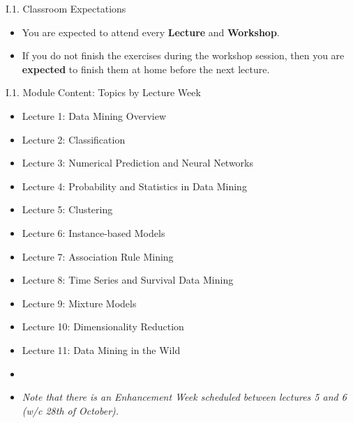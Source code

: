 \documentclass[handout]{beamer}
\newcommand{\strong}[1]{\textbf{\color{teal} #1}}
\begin{document}
\begin{frame}{I.1. Classroom Expectations}
\begin{itemize}
%
\item You are expected to attend every \strong{Lecture} and \strong{Workshop}.\\

\item If you do not finish the exercises during the workshop session, then you are \strong{expected} to finish them at home before the next lecture.
%
\end{itemize}
\end{frame}
\begin{frame}{I.1. Module Content: Topics by Lecture Week}
\begin{itemize}
\item Lecture 1: Data Mining Overview
\item Lecture 2: Classification
\item Lecture 3: Numerical Prediction and Neural Networks
\item Lecture 4: Probability and Statistics in Data Mining
\item Lecture 5: Clustering
\item Lecture 6: Instance-based Models
\item Lecture 7: Association Rule Mining
\item Lecture 8: Time Series and Survival Data Mining
\item Lecture 9: Mixture Models
\item Lecture 10: Dimensionality Reduction
\item Lecture 11: Data Mining in the Wild
\item[]
\item[] \emph{Note that there is an Enhancement Week scheduled between lectures 5 and 6 (w/c 28th of October).}
\end{itemize}
\end{frame}
\end{document}
